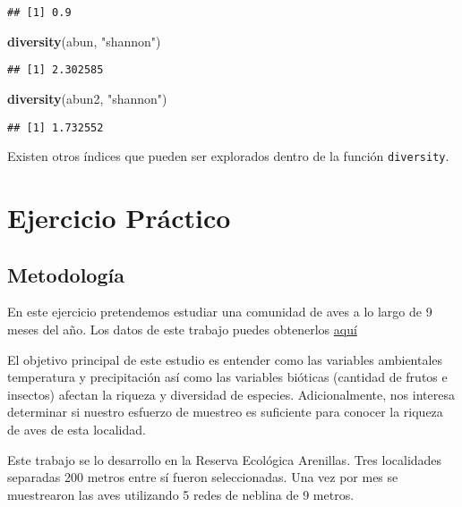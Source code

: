 \documentclass[]{book}
\newenvironment{Shaded}{\begin{snugshade}}{\end{snugshade}}
\newcommand{\KeywordTok}[1]{\textcolor[rgb]{0.13,0.29,0.53}{\textbf{{#1}}}}
\newcommand{\StringTok}[1]{\textcolor[rgb]{0.31,0.60,0.02}{{#1}}}
\newcommand{\NormalTok}[1]{{#1}}
\begin{document}
\begin{verbatim}
## [1] 0.9
\end{verbatim}

\begin{Shaded}
\begin{Highlighting}[]
\KeywordTok{diversity}\NormalTok{(abun, }\StringTok{"shannon"}\NormalTok{)}
\end{Highlighting}
\end{Shaded}

\begin{verbatim}
## [1] 2.302585
\end{verbatim}

\begin{Shaded}
\begin{Highlighting}[]
\KeywordTok{diversity}\NormalTok{(abun2, }\StringTok{"shannon"}\NormalTok{)}
\end{Highlighting}
\end{Shaded}

\begin{verbatim}
## [1] 1.732552
\end{verbatim}

Existen otros índices que pueden ser explorados dentro de la función
\texttt{diversity}.

\chapter{Ejercicio Práctico}\label{ejercicio-practico}

\section{Metodología}\label{metodologia}

En este ejercicio pretendemos estudiar una comunidad de aves a lo largo
de 9 meses del año. Los datos de este trabajo puedes obtenerlos
\href{https://github.com/Ciespinosa/datos_practicas/blob/master/Aves_temporal.xlsx}{aquí}

El objetivo principal de este estudio es entender como las variables
ambientales temperatura y precipitación así como las variables bióticas
(cantidad de frutos e insectos) afectan la riqueza y diversidad de
especies. Adicionalmente, nos interesa determinar si nuestro esfuerzo de
muestreo es suficiente para conocer la riqueza de aves de esta
localidad.

Este trabajo se lo desarrollo en la Reserva Ecológica Arenillas. Tres
localidades separadas 200 metros entre sí fueron seleccionadas. Una vez
por mes se muestrearon las aves utilizando 5 redes de neblina de 9
metros.
\end{document}
